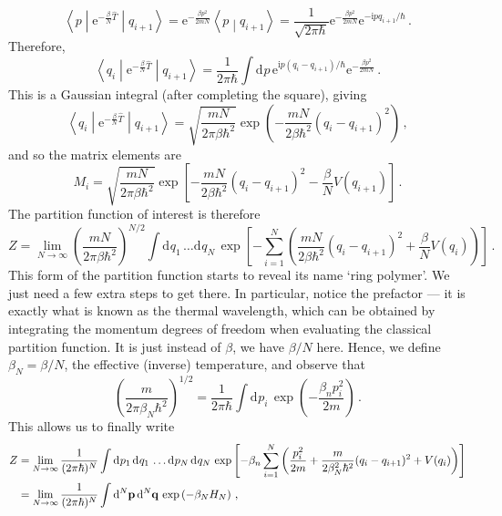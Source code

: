 \documentclass{article}
\theoremstyle{plain}\theoremheaderfont{\normalfont\itshape}\theorembodyfont{\rmfamily}\theoremseparator{.}\newtheorem*{rem}{Remark}\newtheorem*{ex}{Example}\newtheorem*{proof}{Proof}\newtheorem*{altp}{Alternative proof}
\theoremstyle{plain}\theoremheaderfont{\normalfont\bfseries}\theorembodyfont{\rmfamily}\theoremseparator{.}\newtheorem{thm}{Theorem}[section]\newtheorem{lem}[thm]{Lemma}\newtheorem{prop}[thm]{Proposition}\newtheorem*{cor}{Corollary}\newtheorem{defn}[thm]{Definition}\newtheorem{clm}[thm]{Claim}\newtheorem{clminproof}{Claim}
\theoremstyle{break}\theoremheaderfont{\normalfont\itshape}\theorembodyfont{\rmfamily}\theoremseparator{.\medskip}\newtheorem*{proofskip}{Proof}\newtheorem*{exs}{Examples}\newtheorem*{rems}{Remarks}
\theoremstyle{break}\theoremheaderfont{\normalfont\bfseries}\theorembodyfont{\rmfamily}\theoremseparator{.\medskip}\newtheorem{lemskip}[thm]{Lemma}\newtheorem{defnskip}[thm]{Definition}\newtheorem{propskip}[thm]{Proposition}\newtheorem{thmskip}[thm]{Theorem}
\numberwithin{equation}{section}
\newcommand{\ii}{\mathrm{i}}
\newcommand{\ee}{\mathrm{e}}
\newcommand{\dd}[2][]{\mathrm{d}^{#1} #2\,}
\newcommand{\braket}[2]{\left\langle #1 \middle| #2 \right\rangle}
\newcommand{\mel}[3]{\left\langle #1 \middle| #2 \middle| #3 \right\rangle}
\newcommand{\vb}[1]{\bm{\mathrm{#1}}}
\begin{document}
    \begin{equation}
        \mel{p}{\ee^{-\frac{\beta}{N}\hat{T}}}{q_{i+1}}=\ee^{-\frac{\beta p^2}{2mN}}\braket{p}{q_{i+1}}=\frac{1}{\sqrt{2\pi\hbar}}\ee^{-\frac{\beta p^2}{2mN}}\ee^{-\ii p q_{i+1}/\hbar}\,.
    \end{equation}
    Therefore,
    \begin{equation}
        \mel{q_i}{\ee^{-\frac{\beta}{N}\hat{T}}}{q_{i+1}}=\frac{1}{2\pi\hbar}\int\dd{p} \ee^{\ii p (q_i-q_{i+1})/\hbar}\ee^{-\frac{\beta p^2}{2mN}}\,.
    \end{equation}
    This is a Gaussian integral (after completing the square), giving
    \begin{equation}
        \mel{q_i}{\ee^{-\frac{\beta}{N}\hat{T}}}{q_{i+1}}=\sqrt{\frac{mN}{2\pi\beta\hbar^2}}\exp\left(-\frac{mN}{2\beta\hbar^2}(q_i - q_{i+1})^2\right)\,,
    \end{equation}
    and so the matrix elements are
    \begin{equation}
        M_i=\sqrt{\frac{mN}{2\pi\beta\hbar^2}}\exp\left[-\frac{mN}{2\beta\hbar^2}(q_i - q_{i+1})^2-\frac{\beta}{N}V(q_{i+1})\right]\,.
    \end{equation}
    The partition function of interest is therefore
    \begin{equation}
        Z=\lim_{N\to\infty}\left(\frac{mN}{2\pi\beta\hbar^2}\right)^{N/2}\int\dd{q_1}\dots\dd{q_N}\exp\left[-\sum_{i=1}^{N}\left(\frac{mN}{2\beta\hbar^2}(q_i - q_{i+1})^2+\frac{\beta}{N}V(q_i)\right)\right]\,.
    \end{equation}
    This form of the partition function starts to reveal its name `ring polymer'. We just need a few extra steps to get there. In particular, notice the prefactor --- it is exactly what is known as the thermal wavelength, which can be obtained by integrating the momentum degrees of freedom when evaluating the classical partition function. It is just instead of \(\beta\), we have \(\beta/N\) here. Hence, we define \(\beta_N=\beta/N\), the effective (inverse) temperature, and observe that
    \begin{equation}
        \left(\frac{m}{2\pi\beta_N\hbar^2}\right)^{1/2}=\frac{1}{2\pi\hbar}\int\dd{p_i}\exp\left(-\frac{\beta_np_i^2}{2m}\right)\,.
    \end{equation}
    This allows us to finally write
    \begin{align}
        Z&=\lim_{N\to\infty}\frac{1}{(2\pi\hbar)^N}\int\dd{p_1}\dd{q_1}\dots\dd{p_N}\dd{q_N}\exp\left[-\beta_n\sum_{i=1}^{N}\left(\frac{p_i^2}{2m}+\frac{m}{2\beta_N^2\hbar^2}(q_i-q_{i+1})^2+V(q_i)\right)\right]\notag\\
        &=\lim_{N\to\infty}\frac{1}{(2\pi\hbar)^N}\int\dd[N]{\vb{p}}\dd[N]{\vb{q}}\exp\left(-\beta_N H_N\right)\,,
    \end{align}
\end{document}
